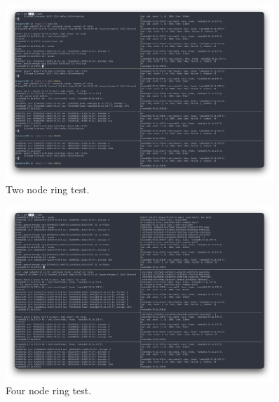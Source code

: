\documentclass[a4paper, 11pt]{article}
\begin{document}
\begin{figure}[H]
  \centering
  \includegraphics[width=0.9\textwidth]{screenshots/dual.png}
  \caption{Two node ring test.}
  \label{fig:test2}
\end{figure}

\begin{figure}[H]
  \centering
  \includegraphics[width=0.9\textwidth]{screenshots/8_machines.png}
  \caption{Four node ring test.}
  \label{fig:test3}
\end{figure}
\end{document}
